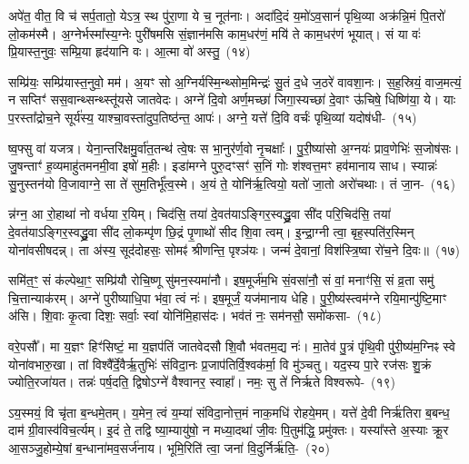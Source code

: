 {\anuvakamend[{आ तवो॒र्जा\-ऽनु॒ षोड॑श च}]}

अपे॑त॒ वीत॒ वि च॑ सर्प॒तातो॒ ये\-ऽत्र॒ स्थ पु॑रा॒णा ये च॒ नूत॑नाः। अदा॑दि॒दं य॒मो॑\-ऽव॒सानं॑ पृथि॒व्या अक्र॑न्नि॒मं पि॒तरो॑ लो॒कम॑स्मै। अ॒ग्नेर्भस्मा᳚स्य॒ग्नेः पुरी॑षमसि सं॒ज्ञान॑मसि काम॒धर॑णं॒ मयि॑ ते काम॒धर॑णं भूयात्। सं या वः॑ प्रि॒यास्त॒नुवः॒ सम्प्रि॒या हृद॑यानि वः। आ॒त्मा वो॑ अस्तु॒~(१४)\ip

सम्प्रि॑यः॒ सम्प्रि॑यास्त॒नुवो॒ मम॑। अ॒यꣳ सो अ॒ग्निर्यस्मि॒न्थ्सोम॒\-मिन्द्रः॑ सु॒तं द॒धे ज॒ठरे॑ वावशा॒नः। स॒ह॒स्रियं॒ वाज॒मत्यं॒ न सप्तिꣳ॑ सस॒वान्थ्सन्थ्स्तू॑यसे जातवेदः। अग्ने॑ दि॒वो अर्ण॒मच्छा॑ जिगा॒स्यच्छा॑ दे॒वाꣳ ऊ॑चिषे॒ धिष्णि॑या॒ ये। याः प॒रस्ता᳚द्रोच॒ने सूर्य॑स्य॒ याश्चा॒वस्ता॑दुप॒तिष्ठ॑न्त॒ आपः॑। अग्ने॒ यत्ते॑ दि॒वि वर्चः॑ पृथि॒व्यां यदोष॑धी-~(१५)\ip

ष्व॒फ्सु वा॑ यजत्र। येना॒न्तरि॑क्षमु॒र्वा॑त॒तन्थ॑ त्वे॒षः स भा॒नुर॑र्ण॒वो नृ॒चक्षाः᳚। पु॒री॒ष्या॑सो अ॒ग्नयः॑ प्राव॒णेभिः॑ स॒जोष॑सः। जु॒षन्ताꣳ॑ ह॒व्यमाहु॑तमनमी॒वा इषो॑ म॒हीः। इडा॑मग्ने पुरु॒दꣳसꣳ॑ स॒निं गोः श॑श्वत्त॒मꣳ हव॑मानाय साध। स्यान्नः॑ सु॒नुस्तन॑यो वि॒जावाग्ने॒ सा ते॑ सुम॒तिर्भू᳚त्व॒स्मे। अ॒यं ते॒ योनि॑र्\mbox{}ऋ॒त्वियो॒ यतो॑ जा॒तो अरो॑चथाः। तं जा॒न-~(१६)\ip

न्न॑ग्न॒ आ रो॒हाथा॑ नो वर्धया र॒यिम्। चिद॑सि॒ तया॑ दे॒वत॑या\-ऽ\-ङ्गिर॒स्वद्ध्रु॒वा सी॑द परि॒चिद॑सि॒ तया॑ दे॒वत॑या\-ऽङ्गिर॒स्वद्ध्रु॒वा सी॑द लो॒कम्पृ॑ण छि॒द्रं पृ॒णाथो॑ सीद शि॒वा त्वम्। इ॒न्द्रा॒ग्नी त्वा॒ बृह॒स्पति॑र॒स्मिन् योना॑वसीषदन्न्। ता अ॑स्य॒ सूद॑दोहसः॒ सोमꣴ॑ श्रीणन्ति॒ पृश्ञ॑यः। जन्मं॑ दे॒वानां॒ विश॑स्त्रि॒ष्वा रो॑च॒ने दि॒वः॥~(१७)\ip

{\anuvakamend[{अ॒स्त्वोष॑धीषु जा॒नन्न॒ष्टाच॑त्वारिꣳशच्च}]}

समि॑त॒ꣳ॒ सं क॑ल्पेथा॒ꣳ॒ सम्प्रि॑यौ रोचि॒ष्णू सु॑मन॒स्यमा॑नौ। इष॒मूर्ज॑म॒भि सं॒वसा॑नौ॒ सं वां॒ मनाꣳ॑सि॒ सं व्र॒ता समु॑ चि॒त्तान्याक॑रम्। अग्ने॑ पुरीष्याधि॒पा भ॑वा॒ त्वं नः॑। इष॒मूर्जं॒ यज॑मानाय धेहि। पु॒री॒ष्य॑स्त्वम॑ग्ने रयि॒मान्पु॑ष्टि॒माꣳ अ॑सि। शि॒वाः कृ॒त्वा दिशः॒ सर्वाः॒ स्वां योनि॑मि॒हास॑दः। भव॑तं नः॒ सम॑नसौ॒ समो॑कसा-~(१८)\ip

वरे॒पसौ᳚। मा य॒ज्ञꣳ हिꣳ॑सिष्टं॒ मा य॒ज्ञप॑तिं जातवेदसौ शि॒वौ भ॑वतम॒द्य नः॑। मा॒तेव॑ पु॒त्रं पृ॑थि॒वी पु॑री॒ष्य॑म॒ग्निꣴ स्वे योना॑वभारु॒खा। तां विश्वै᳚र्दे॒वैर्\mbox{}ऋ॒तुभिः॑ संविदा॒नः प्र॒जा\-प॑तिर्वि॒श्वक॑र्मा॒ वि मु॑ञ्चतु। यद॒स्य पा॒रे रज॑सः शु॒क्रं ज्योति॒रजा॑यत। तन्नः॑ पर्\mbox{}ष॒दति॒ द्विषो\-ऽग्ने॑ वैश्वानर॒ स्वाहा᳚। नमः॒ सु ते॑ निर्\mbox{}ऋते विश्वरूपे-~(१९)\ip

ऽय॒स्मयं॒ वि चृ॑ता ब॒न्धमे॒तम्। य॒मेन॒ त्वं य॒म्या॑ संविदा॒नोत्त॒मं नाक॒मधि॑ रोहये॒मम्। यत्ते॑ दे॒वी निर्\mbox{}ऋ॑तिरा ब॒बन्ध॒ दाम॑ ग्री॒वास्व॑विच॒र्त्यम्। इ॒दं ते॒ तद्वि ष्या॒म्यायु॑षो॒ न मध्या॒दथा॑ जी॒वः पि॒तुम॑द्धि॒ प्रमु॑क्तः। यस्या᳚स्ते अ॒स्याः क्रू॒र आ॒सञ्जु॒होम्ये॒षां ब॒न्धाना॑मव॒सर्ज॑नाय। भूमि॒रिति॑ त्वा॒ जना॑ वि॒दुर्निर्\mbox{}ऋ॑ति॒-~(२०)\ip

